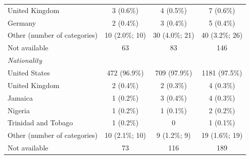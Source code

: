 \begin{table}[ht!]
\begin{tabular}{lccc}
\quad United Kingdom & 3 (0.6\%) & 4 (0.5\%) & 7 (0.6\%) \\
\quad Germany & 2 (0.4\%) & 3 (0.4\%) & 5 (0.4\%) \\
\quad Other (number of categories) & 10 (2.0\%; 10) & 30 (4.0\%; 21) & 40 (3.2\%; 26) \\
\quad Not available & 63 & 83 & 146 \\
\addlinespace
\textit{Nationality} & & & \\
\quad United States & 472 (96.9\%) & 709 (97.9\%) & 1181 (97.5\%) \\
\quad United Kingdom & 2 (0.4\%) & 2 (0.3\%) & 4 (0.3\%) \\
\quad Jamaica & 1 (0.2\%) & 3 (0.4\%) & 4 (0.3\%) \\
\quad Nigeria & 1 (0.2\%) & 1 (0.1\%) & 2 (0.2\%) \\
\quad Trinidad and Tobago & 1 (0.2\%) & 0 & 1 (0.1\%) \\
\quad Other (number of categories) & 10 (2.1\%; 10) & 9 (1.2\%; 9) & 19 (1.6\%; 19) \\
\quad Not available & 73 & 116 & 189 \\
\bottomrule
\end{tabular}
\end{table}

